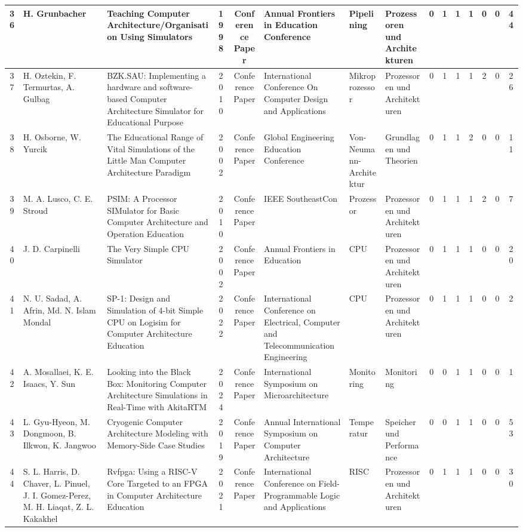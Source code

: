 \begin{landscape}
\begin{longtable}{|c|p{2cm}|p{2cm}|c|c|p{2cm}|p{1cm}|p{1cm}|c|c|c|c|c|c|c|}
    36 & H. Grunbacher & Teaching Computer Architecture/Organisation Using Simulators & 1998 & Conference Paper & Annual Frontiers in Education Conference & Pipelining & Prozessoren und Architekturen & 0 & 1 & 1 & 1 & 0 & 0 & 44 \\ \hline
    37 & H. Oztekin, F. Termurtas, A. Gulbag & BZK.SAU: Implementing a hardware and software-based Computer Architecture Simulator for Educational Purpose & 2010 & Conference Paper & International Conference On Computer Design and Applications & Mikroprozessor & Prozessoren und Architekturen & 0 & 1 & 1 & 1 & 2 & 0 & 26 \\ \hline
    38 & H. Osborne, W. Yurcik & The Educational Range of Vital Simulations of the Little Man Computer Architecture Paradigm & 2002 & Conference Paper & Global Engineering Education Conference & Von-Neumann-Architektur & Grundlagen und Theorien & 0 & 1 & 1 & 2 & 0 & 0 & 11 \\ \hline
    39 & M. A. Lusco, C. E. Stroud & PSIM: A Processor SIMulator for Basic Computer Architecture and Operation Education & 2010 & Conference Paper & IEEE SoutheastCon & Prozessor & Prozessoren und Architekturen & 0 & 1 & 1 & 1 & 2 & 0 & 7 \\ \hline
    40 & J. D. Carpinelli & The Very Simple CPU Simulator & 2002 & Conference Paper & Annual Frontiers in Education & CPU & Prozessoren und Architekturen & 0 & 1 & 1 & 1 & 0 & 0 & 20 \\ \hline
    41 & N. U. Sadad, A. Afrin, Md. N. Islam Mondal & SP-1: Design and Simulation of 4-bit Simple CPU on Logisim for Computer Architecture Education & 2022 & Conference Paper & International Conference on Electrical, Computer and Telecommunication Engineering & CPU & Prozessoren und Architekturen & 0 & 1 & 1 & 1 & 0 & 0 & 2 \\ \hline
    42 & A. Mosallaei, K. E. Isaacs, Y. Sun & Looking into the Black Box: Monitoring Computer Architecture Simulations in Real-Time with AkitaRTM & 2024 & Conference Paper & International Symposium on Microarchitecture & Monitoring & Monitoring & 0 & 0 & 1 & 1 & 0 & 0 & 1 \\ \hline
    43 & L. Gyu-Hyeon, M. Dongmoon, B. Ilkwon, K. Jangwoo & Cryogenic Computer Architecture Modeling with Memory-Side Case Studies & 2019 & Conference Paper & Annual International Symposium on Computer Architecture & Temperatur & Speicher und Performance & 0 & 0 & 1 & 1 & 0 & 0 & 53 \\ \hline
    44 & S. L. Harris, D. Chaver, L. Pinuel, J. I. Gomez-Perez, M. H. Liaqat, Z. L. Kakakhel & Rvfpga: Using a RISC-V Core Targeted to an FPGA in Computer Architecture Education & 2021 & Conference Paper & International Conference on Field-Programmable Logic and Applications & RISC & Prozessoren und Architekturen & 0 & 1 & 1 & 1 & 0 & 0 & 30 \\ \hline

\end{longtable}
\end{landscape}
